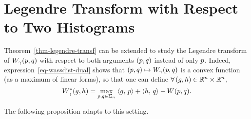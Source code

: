 

\section{Legendre Transform with Respect to Two Histograms}\label{sub:two}

Theorem~\ref{thm-legendre-transf} can be extended to study the Legendre transform of $W_\gamma(p,q)$ with respect to both arguments $(p,q)$ instead of only $p$. Indeed, expression~\eqref{eq-wassdist-dual} shows that $(p,q) \mapsto W_\gamma(p,q)$ is a convex function (as a maximum of linear forms), so that one can define $\forall \, (g,h) \in \mathbb{R}^n \times \mathbb{R}^n$,
%
$$	
W^*_\gamma(g,h) = \underset{p,q \in \Sigma_n}{\max}\; \langle g,\,p\rangle + \langle h,\,q\rangle - W(p,q).
$$

The following proposition adapts  to this setting.


